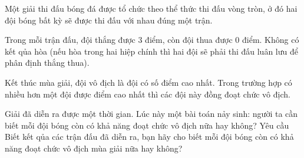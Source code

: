 Một giải thi đấu bóng đá được tổ chức theo thể thức thi đấu vòng tròn, ở đó hai đội bóng bất kỳ sẽ được thi đấu với nhau đúng một trận.  

   Trong mỗi trận đấu, đội thắng được 3 điểm, còn đội thua được 0 điểm. Không có kết qủa hòa (nếu hòa trong hai hiệp chính thì hai đội sẽ phải thi đấu luân lưu để phân định thắng thua).  

   Kết thúc mùa giải, đội vô địch là đội có số điểm cao nhất. Trong trường hợp có nhiều hơn một đội được điểm cao nhất thì các đội này đồng đoạt chức vô địch.  

   Giải đã diễn ra được một thời gian. Lúc này một bài toán nảy sinh: người ta cần biết mỗi đội bóng còn có khả năng đoạt chức vô địch nữa hay không?
Yêu cầu
Biết kết qủa các trận đấu đã diễn ra, bạn hãy cho biết mỗi đội bóng còn có khả năng đoạt chức vô địch mùa giải nữa hay không?